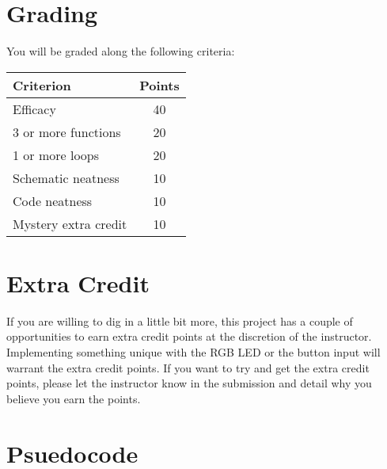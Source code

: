 \section*{Grading}
You will be graded along the following criteria:

\begin{table*}
    \begin{tabular}{ l | c }
        \toprule
        Criterion & Points \\

        \midrule
        Efficacy & 40 \\
        3 or more functions & 20 \\
        1 or more loops & 20 \\
        Schematic neatness & 10 \\
        Code neatness & 10 \\
        Mystery extra credit & 10 \\

        \bottomrule
    \end{tabular}
\end{table*}

\section*{Extra Credit}

If you are willing to dig in a little bit more, this project has a couple of opportunities to earn extra credit points at the discretion of the instructor.
Implementing something unique with the RGB LED or the button input will warrant the extra credit points.
If you want to try and get the extra credit points, please let the instructor know in the submission and detail why you believe you earn the points.

\section*{Psuedocode}

